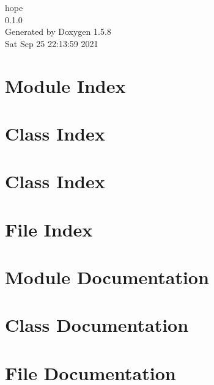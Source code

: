 \documentclass[a4paper]{book}
\begin{document}
\begin{titlepage}
\vspace*{7cm}
\begin{center}
{\Large hope \\[1ex]\large 0.1.0 }\\
\vspace*{1cm}
{\large Generated by Doxygen 1.5.8}\\
\vspace*{0.5cm}
{\small Sat Sep 25 22:13:59 2021}\\
\end{center}
\end{titlepage}
\clearemptydoublepage
{}
\tableofcontents
\clearemptydoublepage
{}
\chapter{Module Index}

\chapter{Class Index}

\chapter{Class Index}

\chapter{File Index}

\chapter{Module Documentation}

\chapter{Class Documentation}







\chapter{File Documentation}





\printindex
\end{document}
